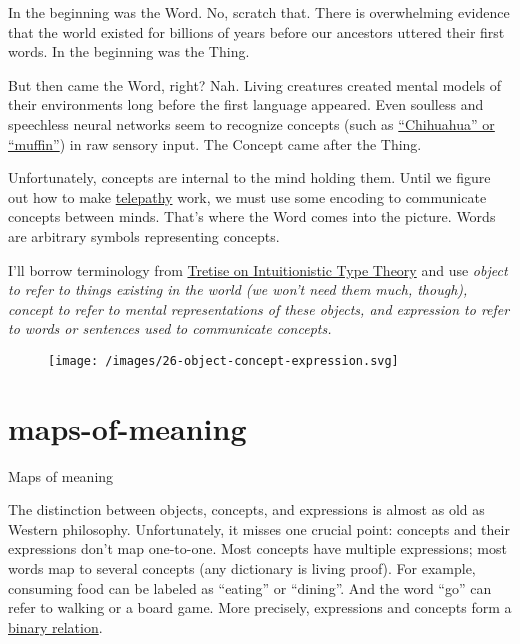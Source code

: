\documentclass{article}
\begin{document}
In the beginning was the Word.
No, scratch that.
There is overwhelming evidence that the world existed for billions of years before our ancestors uttered their first words.
In the beginning was the Thing.

But then came the Word, right? Nah.
Living creatures created mental models of their environments long before the first language appeared.
Even soulless and speechless neural networks seem to recognize concepts (such as \href{https://github.com/rcgc/chihuahua-muffin}{``Chihuahua'' or ``muffin''}) in raw sensory input.
The Concept came after the Thing.

Unfortunately, concepts are internal to the mind holding them.
Until we figure out how to make \href{https://en.wikipedia.org/wiki/Telepathy}{telepathy} work, we must use some encoding to communicate concepts between minds.
That's where the Word comes into the picture.
Words are arbitrary symbols representing concepts.

I'll borrow terminology from \href{https://link.springer.com/book/10.1007/978-94-007-1736-7}{Tretise on Intuitionistic Type Theory} and use
\em{object} to refer to things existing in the world (we won't need them much, though),
\em{concept} to refer to mental representations of these objects,
and \em{expression} to refer to words or sentences used to communicate concepts.

\begin{figure}[grayscale-diagram]
  \texttt{[image: /images/26-object-concept-expression.svg]}
\end{figure}

\section{maps-of-meaning}{Maps of meaning}

The distinction between objects, concepts, and expressions is almost as old as Western philosophy.
Unfortunately, it misses one crucial point: concepts and their expressions don't map one-to-one.
Most concepts have multiple expressions; most words map to several concepts (any dictionary is living proof).
For example, consuming food can be labeled as ``eating'' or ``dining''.
And the word ``go'' can refer to walking or a board game.
More precisely, expressions and concepts form a \href{https://en.wikipedia.org/wiki/Binary_relation}{binary relation}.
\end{document}
